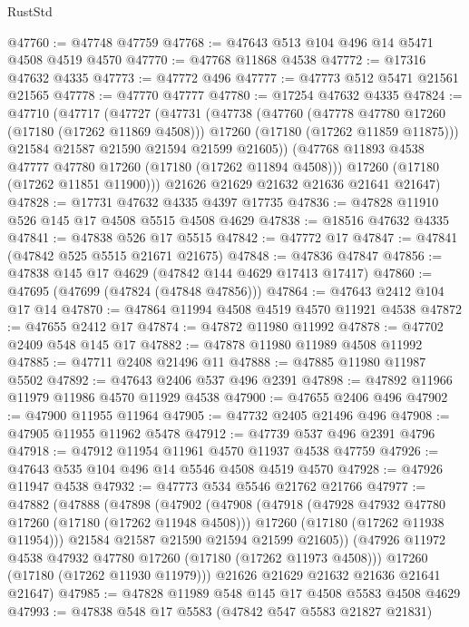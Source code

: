 \begin{lexlean}{RustStd}
\begin{coremodule}
{\begin{coremodule}
{{{{{{{{{{{{{{{{{{{{{{{{{{{{{{{{{{{{{{{{{{{{{{{{{{{{{{{@47760 := @47748 @47759
@47768 := @47643 @513 @104 @496 @14 @5471 @4508 @4519 @4570
@47770 := @47768 @11868 @4538
@47772 := @17316 @47632 @4335
@47773 := @47772 @496
@47777 := @47773 @512 @5471 @21561 @21565
@47778 := @47770 @47777
@47780 := @17254 @47632 @4335
@47824 := @47710
    (@47717
      (@47727
        (@47731
          (@47738
            (@47760
              (@47778 @47780 @17260 (@17180 (@17262 @11869 @4508)))
              @17260
              (@17180 (@17262 @11859 @11875)))
            @21584
            @21587
            @21590
            @21594
            @21599
            @21605))
        (@47768 @11893 @4538 @47777 @47780 @17260 (@17180 (@17262 @11894 @4508)))
        @17260
        (@17180 (@17262 @11851 @11900)))
      @21626
      @21629
      @21632
      @21636
      @21641
      @21647)
@47828 := @17731 @47632 @4335 @4397 @17735
@47836 := @47828 @11910 @526 @145 @17 @4508 @5515 @4508 @4629
@47838 := @18516 @47632 @4335
@47841 := @47838 @526 @17 @5515
@47842 := @47772 @17
@47847 := @47841 (@47842 @525 @5515 @21671 @21675)
@47848 := @47836 @47847
@47856 := @47838 @145 @17 @4629 (@47842 @144 @4629 @17413 @17417)
@47860 := @47695 (@47699 (@47824 (@47848 @47856)))
@47864 := @47643 @2412 @104 @17 @14
@47870 := @47864 @11994 @4508 @4519 @4570 @11921 @4538
@47872 := @47655 @2412 @17
@47874 := @47872 @11980 @11992
@47878 := @47702 @2409 @548 @145 @17
@47882 := @47878 @11980 @11989 @4508 @11992
@47885 := @47711 @2408 @21496 @11
@47888 := @47885 @11980 @11987 @5502
@47892 := @47643 @2406 @537 @496 @2391
@47898 := @47892 @11966 @11979 @11986 @4570 @11929 @4538
@47900 := @47655 @2406 @496
@47902 := @47900 @11955 @11964
@47905 := @47732 @2405 @21496 @496
@47908 := @47905 @11955 @11962 @5478
@47912 := @47739 @537 @496 @2391 @4796
@47918 := @47912 @11954 @11961 @4570 @11937 @4538 @47759
@47926 := @47643 @535 @104 @496 @14 @5546 @4508 @4519 @4570
@47928 := @47926 @11947 @4538
@47932 := @47773 @534 @5546 @21762 @21766
@47977 := @47882
    (@47888
      (@47898
        (@47902
          (@47908
            (@47918
              (@47928 @47932 @47780 @17260 (@17180 (@17262 @11948 @4508)))
              @17260
              (@17180 (@17262 @11938 @11954)))
            @21584
            @21587
            @21590
            @21594
            @21599
            @21605))
        (@47926 @11972 @4538 @47932 @47780 @17260 (@17180 (@17262 @11973 @4508)))
        @17260
        (@17180 (@17262 @11930 @11979)))
      @21626
      @21629
      @21632
      @21636
      @21641
      @21647)
@47985 := @47828 @11989 @548 @145 @17 @4508 @5583 @4508 @4629
@47993 := @47838 @548 @17 @5583 (@47842 @547 @5583 @21827 @21831)
}}}}}}}}}}}}}}}}}}}}}}}}}}}}}}}}}}}}}}}}}}}}}}}}}}}}}}}
\end{coremodule}}
\end{coremodule}
\end{lexlean}
